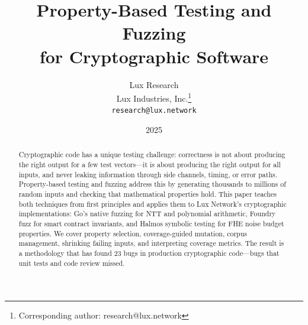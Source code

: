 \documentclass[11pt,a4paper]{article}
\title{Property-Based Testing and Fuzzing\\for Cryptographic Software}
\author{
Lux Research \\
Lux Industries, Inc.\thanks{Corresponding author: research@lux.network}\\
\texttt{research@lux.network}
}
\date{2025}
\begin{document}
\luxcoverpage

\begin{abstract}
Cryptographic code has a unique testing challenge: correctness is not about producing the
right output for a few test vectors---it is about producing the right output for all
inputs, and never leaking information through side channels, timing, or error paths.
Property-based testing and fuzzing address this by generating thousands to millions of
random inputs and checking that mathematical properties hold. This paper teaches both
techniques from first principles and applies them to Lux Network's cryptographic
implementations: Go's native fuzzing for NTT and polynomial arithmetic, Foundry fuzz
for smart contract invariants, and Halmos symbolic testing for FHE noise budget properties.
We cover property selection, coverage-guided mutation, corpus management, shrinking
failing inputs, and interpreting coverage metrics. The result is a methodology that has
found 23 bugs in production cryptographic code---bugs that unit tests and code review
missed.
\end{abstract}

\tableofcontents
\newpage










\end{document}

